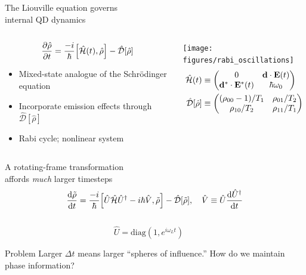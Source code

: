 \documentclass[12pt,usenames,dvipsnames]{beamer}
\begin{document}
\begin{frame}{The Liouville equation governs \\ internal QD dynamics}
  \begin{columns}
    \begin{column}{0.5\textwidth}
      \begin{equation*}
          \pdv{\hat{\rho}}{t} = \frac{-i}{\hbar} \commutator{\hat{\mathcal{H}}(t)}{\hat{\rho}} - \hat{\mathcal{D}}\qty[\hat{\rho}]
        \end{equation*}
        \begin{itemize}
          \item Mixed-state analogue of the Schr\"odinger equation
          \item Incorporate emission effects through $\hat{\mathcal{D}}[\hat{\rho}]$
          \item Rabi cycle; nonlinear system
        \end{itemize}
    \end{column}
    \begin{column}{0.5\textwidth}  %
      \texttt{[image: figures/rabi\_oscillations]}
      \begin{align*}
          \hat{\mathcal{H}}(t) &\equiv \mqty(0 & \vb{d} \cdot \vb{E}(t) \\ \vb{d}^* \cdot \vb{E}^*(t) & \hbar \omega_0) \\
            \hat{\mathcal{D}}[\hat{\rho}] &\equiv \mqty( (\rho_{00} - 1)/T_1 & \rho_{01}/T_2 \\ \rho_{10}/T_2 & \rho_{11}/T_1)
        \end{align*}
    \end{column}
  \end{columns}
\end{frame}

\begin{frame}{A rotating-frame transformation \\ affords \emph{much} larger timesteps}
  \begin{equation*}
    \dv{\tilde{\rho}}{t} = \frac{-i}{\hbar} \commutator{\hat{U} \hat{\mathcal{H}} \hat{U}^\dagger - i \hbar \hat{V}}{\tilde{\rho}} - \hat{\mathcal{D}}\qty[\tilde{\rho}], \quad \hat{V} \equiv \hat{U} \dv{\hat{U}^\dagger}{t}
  \end{equation*}
  \begin{columns}
    \begin{column}{0.4\textwidth}
      \begin{equation*}
        \hat{U} = \mathrm{diag}(1, e^{i \omega_L t})
      \end{equation*}
      \vspace{-0.5cm}
      \begin{alertblock}{Problem}
        Larger $\Delta t$ means larger ``spheres of influence.'' How do we maintain phase information?
      \end{alertblock}
    \end{column}
    \begin{column}{0.6\textwidth}
       
    \end{column}
  \end{columns}
\end{frame}
\end{document}
